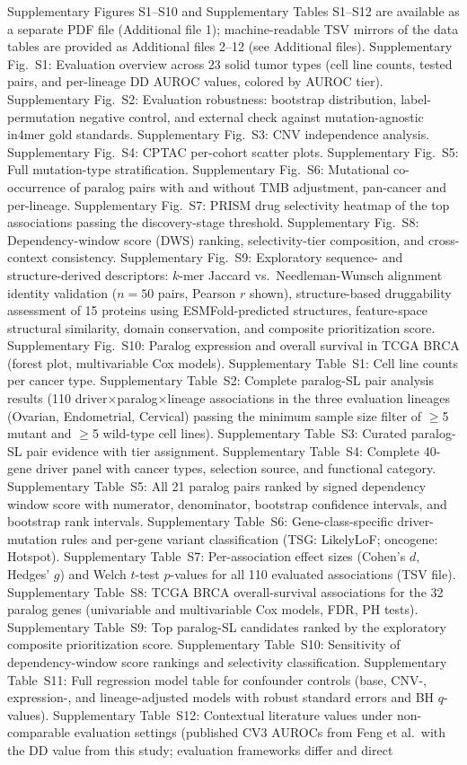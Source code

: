 \documentclass[11pt,a4paper]{article}
\begin{document}
Supplementary Figures S1--S10 and Supplementary Tables S1--S12 are available as a separate PDF file (Additional file 1); machine-readable TSV mirrors of the data tables are provided as Additional files 2--12 (see Additional files). Supplementary Fig.~S1: Evaluation overview across 23 solid tumor types (cell line counts, tested pairs, and per-lineage DD AUROC values, colored by AUROC tier). Supplementary Fig.~S2: Evaluation robustness: bootstrap distribution, label-permutation negative control, and external check against mutation-agnostic in4mer gold standards. Supplementary Fig.~S3: CNV independence analysis. Supplementary Fig.~S4: CPTAC per-cohort scatter plots. Supplementary Fig.~S5: Full mutation-type stratification. Supplementary Fig.~S6: Mutational co-occurrence of paralog pairs with and without TMB adjustment, pan-cancer and per-lineage. Supplementary Fig.~S7: PRISM drug selectivity heatmap of the top associations passing the discovery-stage threshold. Supplementary Fig.~S8: Dependency-window score (DWS) ranking, selectivity-tier composition, and cross-context consistency. Supplementary Fig.~S9: Exploratory sequence- and structure-derived descriptors: $k$-mer Jaccard vs.\ Needleman-Wunsch alignment identity validation ($n=50$ pairs, Pearson $r$ shown), structure-based druggability assessment of 15 proteins using ESMFold-predicted structures, feature-space structural similarity, domain conservation, and composite prioritization score. Supplementary Fig.~S10: Paralog expression and overall survival in TCGA BRCA (forest plot, multivariable Cox models). Supplementary Table~S1: Cell line counts per cancer type. Supplementary Table~S2: Complete paralog-SL pair analysis results (110 driver$\times$paralog$\times$lineage associations in the three evaluation lineages (Ovarian, Endometrial, Cervical) passing the minimum sample size filter of $\ge$5 mutant and $\ge$5 wild-type cell lines). Supplementary Table~S3: Curated paralog-SL pair evidence with tier assignment. Supplementary Table~S4: Complete 40-gene driver panel with cancer types, selection source, and functional category. Supplementary Table~S5: All 21 paralog pairs ranked by signed dependency window score with numerator, denominator, bootstrap confidence intervals, and bootstrap rank intervals. Supplementary Table~S6: Gene-class-specific driver-mutation rules and per-gene variant classification (TSG: LikelyLoF; oncogene: Hotspot). Supplementary Table~S7: Per-association effect sizes (Cohen's $d$, Hedges' $g$) and Welch $t$-test $p$-values for all 110 evaluated associations (TSV file). Supplementary Table~S8: TCGA BRCA overall-survival associations for the 32 paralog genes (univariable and multivariable Cox models, FDR, PH tests). Supplementary Table~S9: Top paralog-SL candidates ranked by the exploratory composite prioritization score. Supplementary Table~S10: Sensitivity of dependency-window score rankings and selectivity classification. Supplementary Table~S11: Full regression model table for confounder controls (base, CNV-, expression-, and lineage-adjusted models with robust standard errors and BH $q$-values). Supplementary Table~S12: Contextual literature values under non-comparable evaluation settings (published CV3 AUROCs from Feng et al.\ with the DD value from this study; evaluation frameworks differ and direct 
\end{document}

